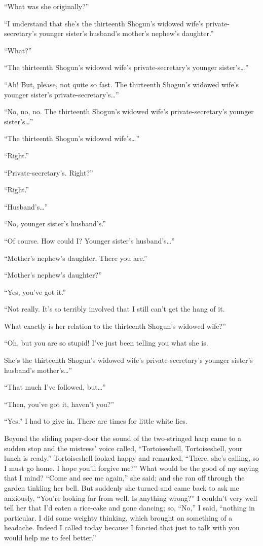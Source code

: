 \documentclass{book}
\begin{document}
``What was she originally?''

``I understand that she's the thirteenth Shogun's widowed wife's
private-secretary's younger sister's husband's mother's nephew's
daughter.''

``What?''

``The thirteenth Shogun's widowed wife's private-secretary's younger
sister's\ldots{}''

``Ah! But, please, not quite so fast. The thirteenth Shogun's widowed
wife's younger sister's private-secretary's\ldots{}''

``No, no, no. The thirteenth Shogun's widowed wife's private-secretary's
younger sister's\ldots{}''

``The thirteenth Shogun's widowed wife's\ldots{}''

``Right.''

``Private-secretary's. Right?''

``Right.''

``Husband's\ldots{}''

``No, younger sister's husband's.''

``Of course. How could I? Younger sister's husband's\ldots{}''

``Mother's nephew's daughter. There you are.''

``Mother's nephew's daughter?''

``Yes, you've got it.''

``Not really. It's so terribly involved that I still can't get the hang
of it.

What exactly is her relation to the thirteenth Shogun's widowed wife?''

``Oh, but you are so stupid! I've just been telling you what she is.

She's the thirteenth Shogun's widowed wife's private-secretary's younger
sister's husband's mother's\ldots{}''

``That much I've followed, but\ldots{}''

``Then, you've got it, haven't you?''

``Yes.'' I had to give in. There are times for little white lies.

Beyond the sliding paper-door the sound of the two-stringed harp came to
a sudden stop and the mistress' voice called, ``Tortoiseshell,
Tortoiseshell, your lunch is ready.'' Tortoiseshell looked happy and
remarked, ``There, she's calling, so I must go home. I hope you'll
forgive me?'' What would be the good of my saying that I mind? ``Come
and see me again,'' she said; and she ran off through the garden
tinkling her bell. But suddenly she turned and came back to ask me
anxiously, ``You're looking far from well. Is anything wrong?'' I
couldn't very well tell her that I'd eaten a rice-cake and gone dancing;
so, ``No,'' I said, ``nothing in particular. I did some weighty
thinking, which brought on something of a headache. Indeed I called
today because I fancied that just to talk with you would help me to feel
better.''
\end{document}
